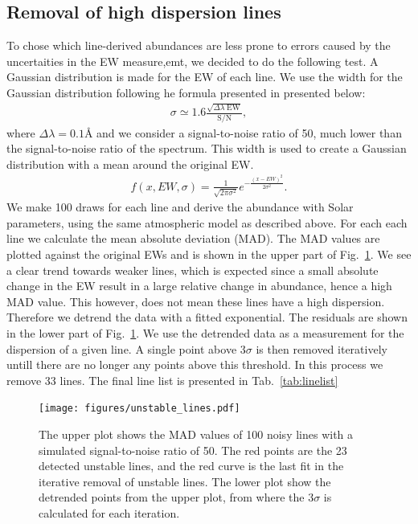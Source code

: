 \documentclass{aa}
\begin{document}
\subsection{Removal of high dispersion lines}
\label{sub:removal_of_unstable_lines}

To chose which line-derived abundances are less prone to errors caused by the
uncertaities in the EW measure,emt, we decided to do the following test.
A Gaussian distribution is made for the
EW of each line. We use the width for the Gaussian distribution following
he formula presented in \citet{Caryel1988} presented below:
\begin{align}
    \sigma \simeq 1.6 \frac{\sqrt{\Delta\lambda\; \mathrm{EW}}}{\mathrm{S/N}},
\end{align}
where $\Delta\lambda=0.1\si{\angstrom}$ and we consider a
signal-to-noise ratio of 50, much lower than the signal-to-noise ratio
of the spectrum. This width is used to create a Gaussian distribution with
a mean around the original EW.
\begin{align}
    f(x, EW, \sigma) = \frac{1}{\sqrt{2\pi\sigma^2}} e^{-\frac{(x-EW)^2}{2\sigma^2}}.
\end{align}
We make 100 draws for each line and derive the abundance with Solar
parameters, using the same atmospheric model as described above. For
each each line we calculate the mean absolute deviation (MAD). The MAD
values are plotted against the original EWs and is shown in the upper part of
Fig.~\ref{fig:unstable_lines}. We see a clear trend towards weaker lines,
which is expected since a small absolute change in the EW result in a
large relative change in abundance, hence a high MAD value. This however,
does not mean these lines have a high dispersion. Therefore we detrend the data
with a fitted exponential. The residuals are shown in the lower part of
Fig.~\ref{fig:unstable_lines}. We use the detrended data as a measurement
for the dispersion of a given line. A single point above $3 \sigma$ is
then removed iteratively untill there are no longer any points above
this threshold. In this process we remove 33 lines. The final line list
is presented in Tab.~\ref{tab:linelist}

\begin{figure}[tbp!]
    \centering
    \texttt{[image: figures/unstable\_lines.pdf]}
    \caption{The upper plot shows the MAD values of 100 noisy lines with
    a simulated signal-to-noise ratio of 50. The red points are the 23
    detected unstable lines, and the red curve is the last fit in the
    iterative removal of unstable lines.
    The lower plot show the detrended points from the upper plot, from
    where the $3\sigma$ is calculated for each iteration.}
    \label{fig:unstable_lines}
\end{figure}
\end{document}
